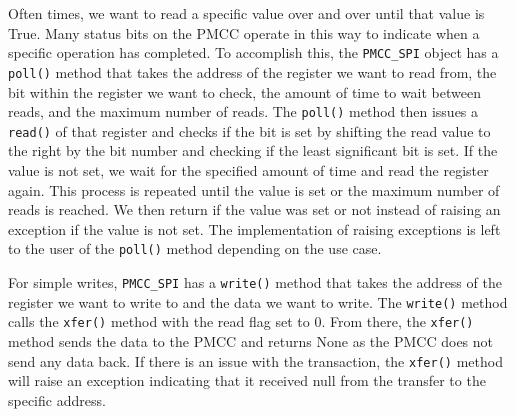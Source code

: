 Often times, we want to read a specific value over and over until that value is True.
Many status bits on the PMCC operate in this way to indicate when a specific operation has completed. 
To accomplish this, the \texttt{PMCC\_SPI} object has a \texttt{poll()} method that takes the address of the register we want to read from, the bit within the register we want to check, the amount of time to wait between reads, and the maximum number of reads.
The \texttt{poll()} method then issues a \texttt{read()} of that register and checks if the bit is set by shifting the read value to the right by the bit number and checking if the least significant bit is set.
If the value is not set, we wait for the specified amount of time and read the register again.
This process is repeated until the value is set or the maximum number of reads is reached.
We then return if the value was set or not instead of raising an exception if the value is not set.
The implementation of raising exceptions is left to the user of the \texttt{poll()} method depending on the use case.

For simple writes, \texttt{PMCC\_SPI} has a \texttt{write()} method that takes the address of the register we want to write to and the data we want to write.
The \texttt{write()} method calls the \texttt{xfer()} method with the read flag set to 0.
From there, the \texttt{xfer()} method sends the data to the PMCC and returns None as the PMCC does not send any data back.
If there is an issue with the transaction, the \texttt{xfer()} method will raise an exception indicating that it received null from the transfer to the specific address. 

